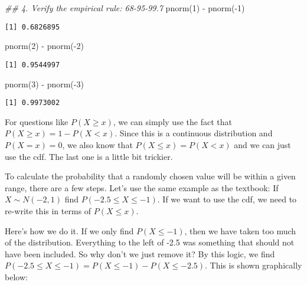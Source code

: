 \documentclass[
  letterpaper,
  DIV=11,
  numbers=noendperiod]{scrreprt}
\newenvironment{Shaded}{\begin{snugshade}}{\end{snugshade}}
\newcommand{\DecValTok}[1]{\textcolor[rgb]{0.68,0.00,0.00}{#1}}
\newcommand{\DocumentationTok}[1]{\textcolor[rgb]{0.37,0.37,0.37}{\textit{#1}}}
\newcommand{\FunctionTok}[1]{\textcolor[rgb]{0.28,0.35,0.67}{#1}}
\newcommand{\NormalTok}[1]{\textcolor[rgb]{0.00,0.23,0.31}{#1}}
\newcommand{\SpecialCharTok}[1]{\textcolor[rgb]{0.37,0.37,0.37}{#1}}
\begin{document}
\begin{Shaded}
\begin{Highlighting}[]
\DocumentationTok{\#\# 4. Verify the empirical rule: 68{-}95{-}99.7}
\FunctionTok{pnorm}\NormalTok{(}\DecValTok{1}\NormalTok{) }\SpecialCharTok{{-}} \FunctionTok{pnorm}\NormalTok{(}\SpecialCharTok{{-}}\DecValTok{1}\NormalTok{)}
\end{Highlighting}
\end{Shaded}

\begin{verbatim}
[1] 0.6826895
\end{verbatim}

\begin{Shaded}
\begin{Highlighting}[]
\FunctionTok{pnorm}\NormalTok{(}\DecValTok{2}\NormalTok{) }\SpecialCharTok{{-}} \FunctionTok{pnorm}\NormalTok{(}\SpecialCharTok{{-}}\DecValTok{2}\NormalTok{)}
\end{Highlighting}
\end{Shaded}

\begin{verbatim}
[1] 0.9544997
\end{verbatim}

\begin{Shaded}
\begin{Highlighting}[]
\FunctionTok{pnorm}\NormalTok{(}\DecValTok{3}\NormalTok{) }\SpecialCharTok{{-}} \FunctionTok{pnorm}\NormalTok{(}\SpecialCharTok{{-}}\DecValTok{3}\NormalTok{)}
\end{Highlighting}
\end{Shaded}

\begin{verbatim}
[1] 0.9973002
\end{verbatim}

For questions like \(P(X\ge x)\), we can simply use the fact that
\(P(X \ge x) = 1 - P(X<x)\). Since this is a continuous distribution and
\(P(X = x)=0\), we also know that \(P(X\le x) = P(X<x)\) and we can just
use the cdf. The last one is a little bit trickier.

To calculate the probability that a randomly chosen value will be within
a given range, there are a few steps. Let's use the same example as the
textbook: If \(X\sim N(-2, 1)\) find \(P(-2.5\le X\le -1)\). If we want
to use the cdf, we need to re-write this in terms of \(P(X\le x)\).

Here's how we do it. If we only find \(P(X\le-1)\), then we have taken
too much of the distribution. Everything to the left of -2.5 was
something that should not have been included. So why don't we just
remove it? By this logic, we find
\(P(-2.5\le X \le -1) = P(X\le -1) - P(X \le -2.5)\). This is shown
graphically below:
\end{document}
